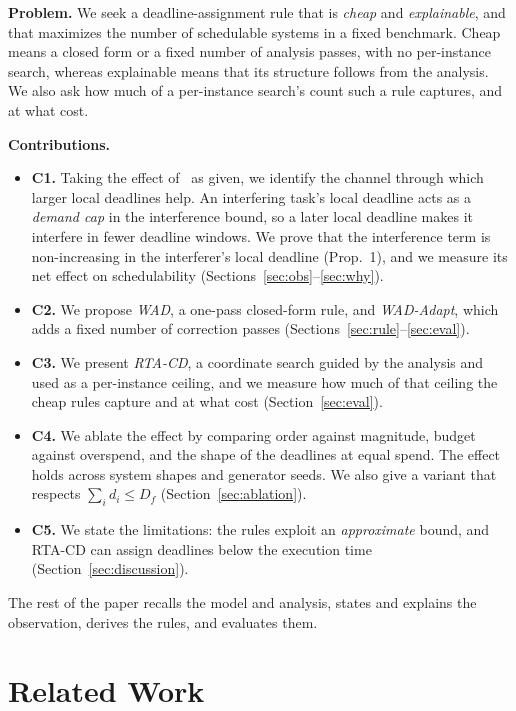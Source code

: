 \documentclass[conference]{IEEEtran}
\begin{document}
\smallskip\noindent\textbf{Problem.} We seek a deadline-assignment rule that is
\emph{cheap} and \emph{explainable}, and that maximizes the number of schedulable
systems in a fixed benchmark. Cheap means a closed form or a fixed number of
analysis passes, with no per-instance search, whereas explainable means that its
structure follows from the analysis. We also ask how much of a per-instance
search's count such a rule captures, and at what cost.

\smallskip\noindent\textbf{Contributions.}
\begin{itemize}
\item \textbf{C1.} Taking the effect of~\cite{rivas15} as given, we identify the
channel through which larger local deadlines help. An interfering task's local
deadline acts as a \emph{demand cap} in the interference bound, so a later local
deadline makes it interfere in fewer deadline windows. We prove that the
interference term is non-increasing in the interferer's local deadline (Prop.~1),
and we measure its net effect on schedulability
(Sections~\ref{sec:obs}--\ref{sec:why}).
\item \textbf{C2.} We propose \emph{WAD}, a one-pass closed-form rule, and
\emph{WAD-Adapt}, which adds a fixed number of correction passes
(Sections~\ref{sec:rule}--\ref{sec:eval}).
\item \textbf{C3.} We present \emph{RTA-CD}, a coordinate search guided by the
analysis and used as a per-instance ceiling, and we measure how much of that
ceiling the cheap rules capture and at what cost (Section~\ref{sec:eval}).
\item \textbf{C4.} We ablate the effect by comparing order against magnitude,
budget against overspend, and the shape of the deadlines at equal spend. The
effect holds across system shapes and generator seeds. We also give a variant
that respects $\sum_i d_i\le D_f$ (Section~\ref{sec:ablation}).
\item \textbf{C5.} We state the limitations: the rules exploit an
\emph{approximate} bound, and RTA-CD can assign deadlines below the execution
time (Section~\ref{sec:discussion}).
\end{itemize}

\noindent The rest of the paper recalls the model and analysis, states and
explains the observation, derives the rules, and evaluates them.

\section{Related Work}
\label{sec:related}
\end{document}

